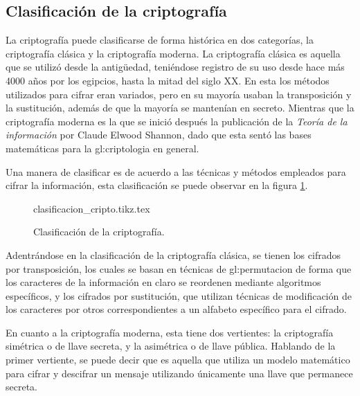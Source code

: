 %
%

\subsection{Clasificación de la criptografía}
\label{sec:clasificacion}

La criptografía puede clasificarse de forma histórica en dos categorías,
la criptografía clásica y la criptografía moderna. La criptografía clásica
es aquella que se utilizó desde la antigüedad, teniéndose registro de su
uso desde hace más 4000 años por los egipcios, hasta la mitad del siglo
XX. En esta los métodos utilizados para cifrar eran variados, pero en su
mayoría usaban la transposición y la sustitución, además de que la mayoría
se mantenían en secreto. Mientras que la criptografía moderna es la que
se inició después la publicación de la \textit{Teoría de la información}
por Claude Elwood Shannon\cite{shannon_teoria}, dado que esta sentó las
bases matemáticas para la \gls{gl:criptologia} en general.

Una manera de clasificar es de acuerdo a las técnicas y métodos empleados
para cifrar la información, esta clasificación se puede observar en la
figura \ref{clasificacion_cripto}.

\begin{figure}
  \begin{center}
    {clasificacion_cripto.tikz.tex}
    \caption{Clasificación de la criptografía.}
    \label{clasificacion_cripto}
  \end{center}
\end{figure}

Adentrándose en la clasificación de la criptografía clásica, se tienen los
cifrados por transposición, los cuales se basan en técnicas de
\gls{gl:permutacion} de forma que los caracteres de la información en claro
se reordenen mediante algoritmos específicos, y los cifrados por sustitución,
que utilizan técnicas de modificación de los caracteres por otros
correspondientes a un alfabeto específico para el cifrado.

En cuanto a la criptografía moderna, esta tiene dos vertientes: la
criptografía simétrica o de llave secreta, y la asimétrica o de llave
pública. Hablando de la primer vertiente, se puede decir que es aquella
que utiliza un modelo matemático para cifrar y descifrar un mensaje
utilizando únicamente una llave que permanece secreta.

